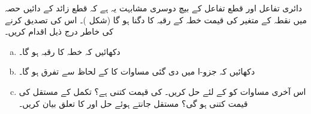 دائری تفاعل اور قطع تفاعل کے بیچ دوسری مشابہت یہ ہے کہ قطع زائد  کے دائیں حصہ میں نقطہ  کے متغیر    کی قیمت خطہ  کے رقبہ کا دگنا ہو گا (شکل )۔ اس کی تصدیق کرنے کی خاطر درج ذیل اقدام کریں۔
\begin{enumerate}[a.]
\item
دکھائیں کہ خطہ  کا رقبہ  ہو گا۔
\item
دکھائیں کہ جزو-ا میں دی گئی مساوات کا  کے لحاظ سے تفرق  ہو گا۔
\item
اس آخری مساوات کو  کے لئے حل کریں۔  کی قیمت کتنی ہے؟ تکمل کے مستقل  کی قیمت کتنی ہو گی؟ مستقل  جانتے ہوئے حل  اور  کا تعلق بیان کریں۔
\end{enumerate}
